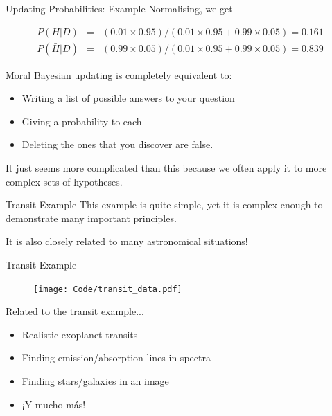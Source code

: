 \begin{frame}[t]{Updating Probabilities: Example}
Normalising, we get

\begin{eqnarray*}
P(H | D) &=& (0.01 \times 0.95)/(0.01 \times 0.95 + 0.99\times0.05) = 0.161\\
P(\bar{H} | D) &=& (0.99 \times 0.05)/(0.01 \times 0.95 + 0.99\times0.05) = 0.839
\end{eqnarray*}
\end{frame}

\begin{frame}[t]{Moral}
Bayesian updating is completely equivalent to:
\begin{itemize}
\item Writing a list of possible answers to your question
\item Giving a probability to each
\item Deleting the ones that you discover are false.
\end{itemize}

It just seems more complicated than this because we often apply it to more
complex sets of hypotheses.
\end{frame}



\begin{frame}[t]{Transit Example}
This example is quite simple, yet it is complex enough to demonstrate many
important principles.
\vspace{1cm}

It is also closely related to many astronomical situations!
\end{frame}


\begin{frame}[t]{Transit Example}
\begin{figure}
\texttt{[image: Code/transit\_data.pdf]}
\end{figure}
\end{frame}



\begin{frame}[t]{Related to the transit example...}
\begin{itemize}
\item Realistic exoplanet transits
\item Finding emission/absorption lines in spectra
\item Finding stars/galaxies in an image
\item ¡Y mucho más!
\end{itemize}
\end{frame}


